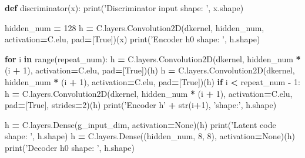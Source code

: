 \documentclass[]{book}
\newenvironment{Shaded}{\begin{snugshade}}{\end{snugshade}}
\newcommand{\KeywordTok}[1]{\textcolor[rgb]{0.13,0.29,0.53}{\textbf{#1}}}
\newcommand{\DecValTok}[1]{\textcolor[rgb]{0.00,0.00,0.81}{#1}}
\newcommand{\StringTok}[1]{\textcolor[rgb]{0.31,0.60,0.02}{#1}}
\newcommand{\VariableTok}[1]{\textcolor[rgb]{0.00,0.00,0.00}{#1}}
\newcommand{\ControlFlowTok}[1]{\textcolor[rgb]{0.13,0.29,0.53}{\textbf{#1}}}
\newcommand{\OperatorTok}[1]{\textcolor[rgb]{0.81,0.36,0.00}{\textbf{#1}}}
\newcommand{\BuiltInTok}[1]{#1}
\newcommand{\NormalTok}[1]{#1}
\theoremstyle{definition}
\theoremstyle{definition}
\theoremstyle{definition}
\theoremstyle{remark}
\begin{document}
\begin{Shaded}
\begin{Highlighting}[]
\KeywordTok{def}\NormalTok{ discriminator(x):}
    \BuiltInTok{print}\NormalTok{(}\StringTok{'Discriminator input shape: '}\NormalTok{, x.shape)}
    
\NormalTok{    hidden_num }\OperatorTok{=} \DecValTok{128}
\NormalTok{    h }\OperatorTok{=}\NormalTok{ C.layers.Convolution2D(dkernel, hidden_num, activation}\OperatorTok{=}\NormalTok{C.elu, pad}\OperatorTok{=}\NormalTok{[}\VariableTok{True}\NormalTok{])(x)}
    \BuiltInTok{print}\NormalTok{(}\StringTok{'Encoder h0 shape: '}\NormalTok{, h.shape)}
    
    \ControlFlowTok{for}\NormalTok{ i }\KeywordTok{in} \BuiltInTok{range}\NormalTok{(repeat_num):}
\NormalTok{        h }\OperatorTok{=}\NormalTok{ C.layers.Convolution2D(dkernel, hidden_num }\OperatorTok{*}\NormalTok{ (i }\OperatorTok{+} \DecValTok{1}\NormalTok{), activation}\OperatorTok{=}\NormalTok{C.elu, pad}\OperatorTok{=}\NormalTok{[}\VariableTok{True}\NormalTok{])(h)}
\NormalTok{        h }\OperatorTok{=}\NormalTok{ C.layers.Convolution2D(dkernel, hidden_num }\OperatorTok{*}\NormalTok{ (i }\OperatorTok{+} \DecValTok{1}\NormalTok{), activation}\OperatorTok{=}\NormalTok{C.elu, pad}\OperatorTok{=}\NormalTok{[}\VariableTok{True}\NormalTok{])(h)}
        \ControlFlowTok{if}\NormalTok{ i }\OperatorTok{<}\NormalTok{ repeat_num }\OperatorTok{-} \DecValTok{1}\NormalTok{:}
\NormalTok{            h }\OperatorTok{=}\NormalTok{ C.layers.Convolution2D(dkernel, hidden_num }\OperatorTok{*}\NormalTok{ (i }\OperatorTok{+} \DecValTok{1}\NormalTok{), activation}\OperatorTok{=}\NormalTok{C.elu, pad}\OperatorTok{=}\NormalTok{[}\VariableTok{True}\NormalTok{], strides}\OperatorTok{=}\DecValTok{2}\NormalTok{)(h)}
        \BuiltInTok{print}\NormalTok{(}\StringTok{'Encoder h'} \OperatorTok{+} \BuiltInTok{str}\NormalTok{(i}\OperatorTok{+}\DecValTok{1}\NormalTok{), }\StringTok{'shape:'}\NormalTok{, h.shape)}
        
\NormalTok{    h }\OperatorTok{=}\NormalTok{ C.layers.Dense(g_input_dim, activation}\OperatorTok{=}\VariableTok{None}\NormalTok{)(h)}
    \BuiltInTok{print}\NormalTok{(}\StringTok{'Latent code shape: '}\NormalTok{, h.shape)}
\NormalTok{    h }\OperatorTok{=}\NormalTok{ C.layers.Dense((hidden_num, }\DecValTok{8}\NormalTok{, }\DecValTok{8}\NormalTok{), activation}\OperatorTok{=}\VariableTok{None}\NormalTok{)(h)}
    \BuiltInTok{print}\NormalTok{(}\StringTok{'Decoder h0 shape: '}\NormalTok{, h.shape)}
    

\end{Highlighting}
\end{Shaded}
\end{document}
